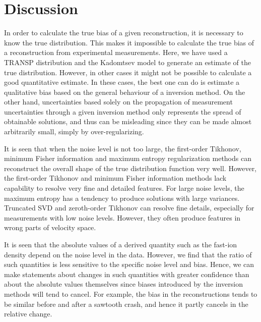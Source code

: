 \section{Discussion}
In order to calculate the true bias of a given reconstruction, it is necessary to know the true distribution. This makes it impossible to calculate the true bias of a reconstruction from experimental measurements. Here, we have used a TRANSP distribution and the Kadomtsev model to generate an estimate of the true distribution. 
However, in other cases it might not be possible to calculate a good quantitative estimate. 
In these cases, the best one can do is estimate a qualitative bias based on the general behaviour of a inversion method.
On the other hand, uncertainties based solely on the propagation of measurement uncertainties through a given inversion method only represents the spread of obtainable solutions, and thus can be misleading since they can be made almost arbitrarily small, simply by over-regularizing.

It is seen that when the noise level is not too large, 
the first-order Tikhonov, minimum Fisher information and maximum entropy regularization methods can reconstruct the overall shape of the true distribution function very well.
However, the first-order Tikhonov and minimum Fisher information methods lack capability to resolve very fine and detailed features.
For large noise levels, the maximum entropy has a tendency to produce solutions with large variances.
Truncated SVD and zeroth-order Tikhonov can resolve fine details, especially for measurements with low noise levels. However, they often produce features in wrong parts of velocity space.

It is seen that the absolute values of a derived quantity such as the fast-ion density depend on the noise level in the data. However, we find that the ratio of such quantities is less sensitive to the specific noise level and bias. Hence, we can make statements about changes in such quantities with greater confidence than about the absolute values themselves since biases introduced by the inversion methods will tend to cancel. For example, the bias in the reconstructions tends to be similar before and after a sawtooth crash, and hence it partly cancels in the relative change.
